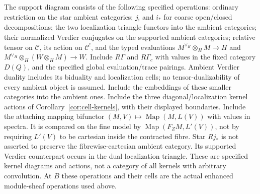 \documentclass[11pt]{article}
\theoremstyle{definition}
\theoremstyle{remark}
\begin{document}
The support diagram consists of the following specified operations:
ordinary restriction on the star ambient categories; $j_!$
and $i_*$ for coarse open/closed decompositions; the two localization
triangle functors into the ambient categories; their normalized Verdier
conjugates on the supported ambient categories; relative tensor on
$\mathcal C$, its action on $\mathcal C^!$, and the typed evaluations
$M^{\vee_H}\otimes_HM\to H$ and
$M^{\vee_H}\otimes_H(W\otimes_HM)\to W$.
Include $R\Gamma$ and $R\Gamma_c$ with values in the fixed category
$D(Q)$, and the specified global evaluation/trace pairings.
Ambient Verdier duality includes its biduality and localization cells;
no tensor-dualizability of every ambient object is assumed.  Include
the embeddings of these smaller categories into the ambient ones.
Include the three diagonal/localization kernel actions of
Corollary~\ref{cor:cell-kernels}, with their displayed boundaries.
Include the attaching mapping bifunctor
$(M,V)\mapsto\operatorname{Map}(M,L(V))$ with values in spectra.
It is compared on the fine model by
$\operatorname{Map}(F_ZM,L'(V))$, not by requiring $L'(V)$ to be
cartesian inside the contracted fibre.  Star $Rj_*$ is not asserted
to preserve the fibrewise-cartesian ambient category.  Its supported
Verdier counterpart occurs in the dual localization triangle.
These are specified kernel diagrams and actions, not a category of all
kernels with arbitrary convolution.  At $B$ these operations and their
cells are the actual enhanced module-sheaf operations used above.
\end{document}
